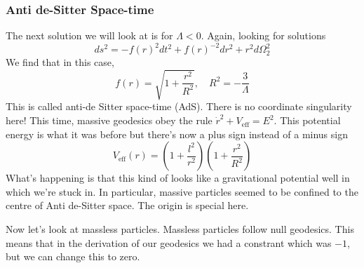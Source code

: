 \subsubsection{Anti de-Sitter Space-time} 
The next solution we will look at is for 
$ \Lambda < 0 $. Again, looking for solutions 
\[
 ds^2 = - f ( r) ^ 2 dt ^ 2 + f ( r) ^{ - 2} dr ^ 2 + r ^ 2 d \Omega _ 2 ^ 2 
\] We find that in this case, 
\[
 f ( r) = \sqrt{ 1 + \frac{ r^ 2 }{ R ^ 2 } }  , \quad R ^ 2 = - \frac{ 3 }{ \Lambda}
\] This is called anti-de Sitter space-time (AdS). 
There is no coordinate singularity here! 
This time, massive geodesics obey the rule $ \dot{ r } ^ 2 + V_{ \text{eff} } = E ^ 2  $. 
This potential energy is what it was before but there's 
now a plus sign instead of a minus sign 
\[
	V_{ \text{eff} } ( r) = \left(  1 + \frac{l ^ 2 }{ r ^ 2 }   \right) \left(  
	1 + \frac{ r ^ 2 }{ R ^ 2 }\right) 
\] What's happening is that 
this kind of looks like a gravitational potential well in which we're stuck in. 
In particular, massive particles seemed to be confined to 
the centre of Anti de-Sitter space. The origin 
is special here.

Now let's look at massless particles. 
Massless particles follow null geodesics. This means 
that in the derivation of our geodesics we had a constrant 
which was $- 1 $, but we can change this to zero. 

